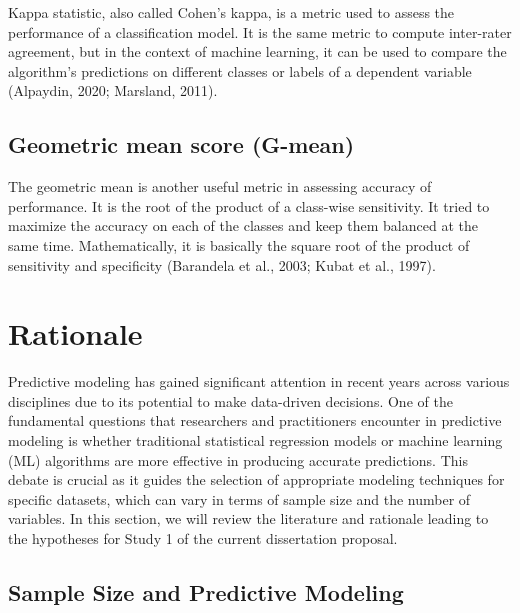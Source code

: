 \documentclass[
  jou]{apa6}
\begin{document}
Kappa statistic, also called Cohen's kappa, is a metric used to assess the performance of a classification model.
It is the same metric to compute inter-rater agreement, but in the context of machine learning, it can be used to compare the algorithm's predictions on different classes or labels of a dependent variable (Alpaydin, 2020; Marsland, 2011).

\hypertarget{geometric-mean-score-g-mean}{%
\subsection{Geometric mean score (G-mean)}\label{geometric-mean-score-g-mean}}

The geometric mean is another useful metric in assessing accuracy of performance.
It is the root of the product of a class-wise sensitivity.
It tried to maximize the accuracy on each of the classes and keep them balanced at the same time.
Mathematically, it is basically the square root of the product of sensitivity and specificity (Barandela et al., 2003; Kubat et al., 1997).

\hypertarget{rationale}{%
\section{Rationale}\label{rationale}}

Predictive modeling has gained significant attention in recent years across various disciplines due to its potential to make data-driven decisions.
One of the fundamental questions that researchers and practitioners encounter in predictive modeling is whether traditional statistical regression models or machine learning (ML) algorithms are more effective in producing accurate predictions.
This debate is crucial as it guides the selection of appropriate modeling techniques for specific datasets, which can vary in terms of sample size and the number of variables.
In this section, we will review the literature and rationale leading to the hypotheses for Study 1 of the current dissertation proposal.

\hypertarget{sample-size-and-predictive-modeling}{%
\subsection{Sample Size and Predictive Modeling}\label{sample-size-and-predictive-modeling}}
\end{document}
